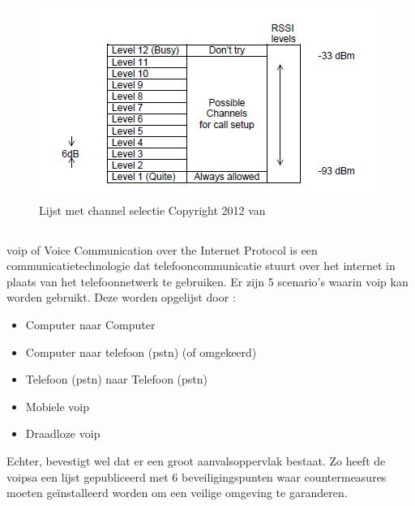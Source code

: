 \begin{figure}[H]
  \includegraphics[width=\linewidth]{../graphics/ULE-channels.jpg}
  \caption{Lijst met channel selectie \autocite[Door][]{Das2012} Copyright 2012 van \textcite{Das2012}}
  \label{fig:ule-channels}
\end{figure}

\subsection{}%
\label{sec:voip}%

\gls{voip} of Voice Communication over the Internet Protocol is een communicatietechnologie dat telefooncommunicatie stuurt over het internet in plaats van het telefoonnetwerk te gebruiken. \Autocite{Soenmez2018} Er zijn 5 scenario's waarin \gls{voip} kan worden gebruikt. Deze worden opgelijst door \textcite{Soenmez2018}:

\begin{itemize}
  \item Computer naar Computer
  \item Computer naar telefoon (\gls{pstn}) (of omgekeerd)
  \item Telefoon (\gls{pstn}) naar Telefoon (\gls{pstn})
  \item Mobiele \gls{voip}
  \item Draadloze \gls{voip}
\end{itemize}

Echter, \textcite{Soenmez2018} bevestigt wel dat er een groot aanvalsoppervlak bestaat. Zo heeft de \gls{voipsa} een lijst gepubliceerd met 6 beveiligingspunten waar countermeasures moeten geïnstalleerd worden om een veilige omgeving te garanderen.

\section{}%
\label{sec:data}%

